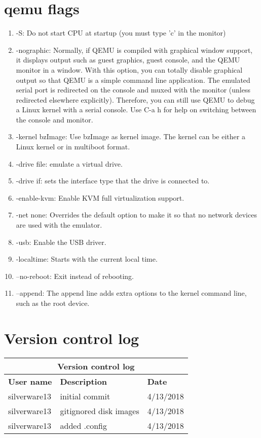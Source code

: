 \documentclass[journal,10pt,onecolumn,letterpaper,draftclsnofoot]{IEEEtran}
\begin{document}
\newpage
\section{qemu flags}
\begin{enumerate}
\item -S: Do not start CPU at startup (you must type 'c' in the monitor)
\item -nographic: Normally, if QEMU is compiled with graphical window support, it displays output such as guest graphics, guest console, and the QEMU monitor in a window. With this option, you can totally disable graphical output so that QEMU is a simple command line application. The emulated serial port is redirected on the console and muxed with the monitor (unless redirected elsewhere explicitly). Therefore, you can still use QEMU to debug a Linux kernel with a serial console. Use C-a h for help on switching between the console and monitor.
\item -kernel bzImage: Use bzImage as kernel image. The kernel can be either a Linux kernel or in multiboot format.
\item -drive file: emulate a virtual drive.
\item -drive if: sets the interface type that the drive is connected to.
\item -enable-kvm:  Enable KVM full virtualization support.
\item -net none: Overrides the default option to make it so that no network devices are used with the emulator.
\item -usb: Enable the USB driver.
\item -localtime: Starts with the current local time.
\item --no-reboot: Exit instead of rebooting. 
\item --append: The append line adds extra options to the kernel command line, such as the root device.
\end{enumerate}

\section{Version control log}

\bigskip
\centering
\begin{tabular}{ |p{3cm}|p{10cm}|p{3cm}|  }
 \hline
 \multicolumn{3}{|c|}{\textbf{Version control log}} \\
 \hline
 \textbf{User name} &\textbf{Description} &\textbf{Date}\\
 \hline
 silverware13   & initial commit    &4/13/2018\\
 \hline
  silverware13   & gitignored disk images    &4/13/2018\\
 \hline
  silverware13   & added .config    &4/13/2018\\
 \hline
\end{tabular}
\end{document}
